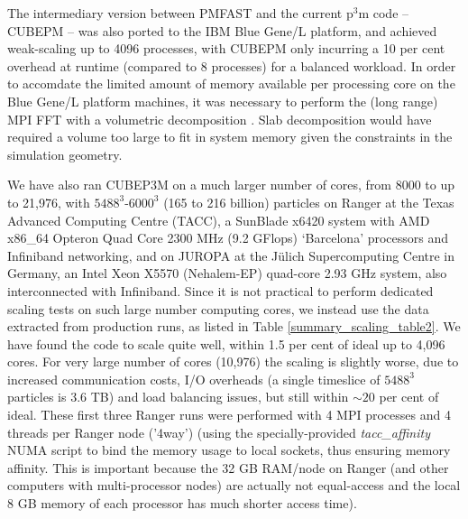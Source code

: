 The intermediary version between {\small PMFAST} and  the current p$^3$m code -- {\small CUBEPM} --
was also ported to the IBM Blue Gene/L platform, and achieved 
weak-scaling up to 4096 processes, with {\small CUBEPM} only incurring a 10 per cent overhead 
at runtime (compared to 8 processes) for a balanced workload.  In order to 
accomdate the limited amount of memory available per processing core on the 
Blue Gene/L platform machines, it was necessary to perform the (long range) MPI FFT
with a volumetric decomposition \citep{3DFFT}.
Slab decomposition would have required a volume too large to fit in system 
memory given the constraints in the simulation geometry. 

We have also ran {\small CUBEP3M} on a much larger number of cores, 
from 8000 to up to 21,976, with $5488^3$-$6000^3$ (165 to 216 billion) 
particles on Ranger at the Texas Advanced Computing Centre (TACC), a SunBlade 
x6420 system with AMD x86\_64 Opteron Quad Core 2300 MHz (9.2 GFlops)
`Barcelona' processors and Infiniband networking,%
and on JUROPA at the J\"ulich Supercomputing Centre in Germany, an Intel Xeon X5570 
(Nehalem-EP) quad-core 2.93 GHz system, also interconnected with Infiniband.%
Since it is not practical to perform dedicated scaling tests on such large number 
computing cores, we instead use the data extracted from production runs, 
as listed in Table \ref{summary_scaling_table2}. We have found the 
code to scale quite well, within 1.5 per cent of ideal up to 4,096 cores. 
For very large number of cores (10,976) the scaling is slightly worse,
due to increased communication 
costs, I/O overheads (a single timeslice of $5488^3$ particles is 3.6 TB)
and load balancing issues, but still within $\sim20$ per cent of ideal. 
These first three Ranger runs were performed 
with 4 {\small MPI} processes and 4 threads per Ranger node ('4way') (using the 
specially-provided {\it tacc\_affinity} NUMA script to bind the memory 
usage to local sockets, thus ensuring memory affinity. This is important 
because the 32 GB RAM/node on Ranger (and other computers with 
multi-processor nodes) are actually not equal-access and the local 
8 GB memory of each processor has much shorter access time).

